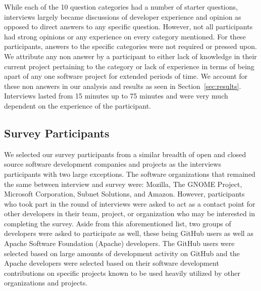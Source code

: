 \documentclass[conference]{IEEEtran}
\newcommand{\totalCategories}{10}
\begin{document}
While each of the \totalCategories{} question categories had a number of starter questions, interviews 
largely became discussions of developer experience and opinion as opposed to direct answers to any specific question.
However, not all participants had strong opinions or any experience on every category mentioned. For these participants, answers 
to the specific categories were not required or pressed upon. We attribute any non answer by a participant to
either lack of knowledge in their current project pertaining to the category or lack of experience in terms of
being apart of any one software project for extended periods of time. We account for these non answers
in our analysis and results as seen in Section~\ref{sec:results}. Interviews lasted 
from 15 minutes up to 75 minutes and were very much dependent on the experience of the participant.


\subsection{Survey Participants}

We selected our survey participants from a similar breadth of open and closed source software development 
companies and projects as the interviews participants with two large exceptions. The software organizations
that remained the same between interview and survey were: Mozilla, The GNOME Project, Microsoft Corporation, 
Subnet Solutions, and Amazon.
However, participants who took part in the round of interviews were asked to act as a contact point for other 
developers in their team, project, or organization who may be interested
in completing the survey. Aside from this aforementioned list, two groups of developers were asked to
participate as well, these being GitHub users as well as Apache Software Foundation (Apache) developers. The GitHub
users were selected based on large amounts of development activity on GitHub and the Apache developers
were selected based on their software development contributions on specific projects known to be used heavily
utilized by other organizations and projects.
\end{document}
